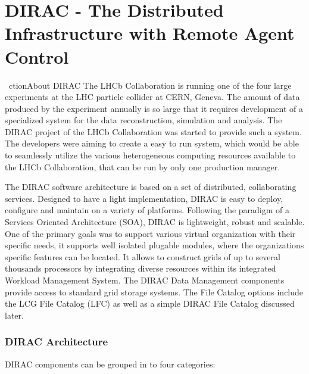 \chapter{DIRAC - The Distributed Infrastructure with Remote Agent Control}

\
ction{About DIRAC}
The LHCb Collaboration \cite{LHCb} is running one of the four large experiments at the LHC particle 
collider at CERN, Geneva. The amount of data produced by the experiment
annually is so large that it requires development of a specialized system for the data reconstruction, simulation 
and analysis. The DIRAC project of the LHCb Collaboration was started to
provide such a system.\cite{Dir2} The developers were aiming to create a easy to run system, which would be able 
to seamlessly utilize the various heterogeneous computing resources available to the LHCb Collaboration, 
that can be run by only one production manager. 

The DIRAC software architecture is based on a set of distributed, collaborating services. Designed to have a
light implementation, DIRAC is easy to deploy, configure and maintain on a variety of platforms. Following
the paradigm of a Services Oriented Architecture (SOA)\cite{SOA}, DIRAC is lightweight, robust and scalable. 
One of the primary goals was to support various virtual organization with their specific needs, it supports well 
isolated plugable modules, where the organizations specific features can be located. It allows to construct
grids of up to several thousands processors by integrating diverse resources within its integrated Workload
Management System. The DIRAC Data Management components provide access to standard grid storage systems. 
The File Catalog options include the LCG File Catalog (LFC) as well as a simple DIRAC File Catalog discussed later. 

\subsection{DIRAC Architecture}
DIRAC components can be grouped in to four categories: 

